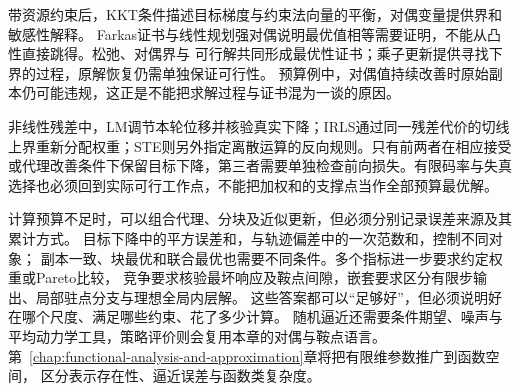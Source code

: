 带资源约束后，KKT条件描述目标梯度与约束法向量的平衡，对偶变量提供界和敏感性解释。
Farkas证书与线性规划强对偶说明最优值相等需要证明，不能从凸性直接跳得。松弛、对偶界与
可行解共同形成最优性证书；乘子更新提供寻找下界的过程，原解恢复仍需单独保证可行性。
预算例中，对偶值持续改善时原始副本仍可能违规，这正是不能把求解过程与证书混为一谈的原因。

非线性残差中，LM调节本轮位移并核验真实下降；IRLS通过同一残差代价的切线上界重新分配权重；STE则另外指定离散运算的反向规则。只有前两者在相应接受或代理改善条件下保留目标下降，第三者需要单独检查前向损失。有限码率与失真选择也必须回到实际可行工作点，不能把加权和的支撑点当作全部预算最优解。

\begin{samepage}
计算预算不足时，可以组合代理、分块及近似更新，但必须分别记录误差来源及其累计方式。
目标下降中的平方误差和，与轨迹偏差中的一次范数和，控制不同对象；
副本一致、块最优和联合最优也需要不同条件。多个指标进一步要求约定权重或Pareto比较，
竞争要求核验最坏响应及鞍点间隙，嵌套要求区分有限步输出、局部驻点分支与理想全局内层解。
这些答案都可以“足够好”，但必须说明好在哪个尺度、满足哪些约束、花了多少计算。
随机逼近还需要条件期望、噪声与平均动力学工具，策略评价则会复用本章的对偶与鞍点语言。
第~\ref{chap:functional-analysis-and-approximation}章将把有限维参数推广到函数空间，
区分表示存在性、逼近误差与函数类复杂度。

\end{samepage}
